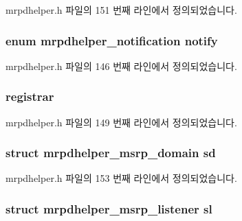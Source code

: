 mrpdhelper.\+h 파일의 151 번째 라인에서 정의되었습니다.

\subsubsection[{\texorpdfstring{notify}{notify}}]{\setlength{\rightskip}{0pt plus 5cm}enum {\bf mrpdhelper\+\_\+notification} notify}\hypertarget{structmrpdhelper__notify_a294b813b26e03fb12eb8d27538996d81}{}\label{structmrpdhelper__notify_a294b813b26e03fb12eb8d27538996d81}


mrpdhelper.\+h 파일의 146 번째 라인에서 정의되었습니다.

\subsubsection[{\texorpdfstring{registrar}{registrar}}]{ registrar}\hypertarget{structmrpdhelper__notify_acb8e6c800425979d17b2c627be3677f3}{}\label{structmrpdhelper__notify_acb8e6c800425979d17b2c627be3677f3}


mrpdhelper.\+h 파일의 149 번째 라인에서 정의되었습니다.

\subsubsection[{\texorpdfstring{sd}{sd}}]{\setlength{\rightskip}{0pt plus 5cm}struct {\bf mrpdhelper\+\_\+msrp\+\_\+domain} sd}\hypertarget{structmrpdhelper__notify_aff24770d46ca745a8f18555b3e052443}{}\label{structmrpdhelper__notify_aff24770d46ca745a8f18555b3e052443}


mrpdhelper.\+h 파일의 153 번째 라인에서 정의되었습니다.

\subsubsection[{\texorpdfstring{sl}{sl}}]{\setlength{\rightskip}{0pt plus 5cm}struct {\bf mrpdhelper\+\_\+msrp\+\_\+listener} sl}\hypertarget{structmrpdhelper__notify_aafc64a8fae35512881b906274c8248df}{}\label{structmrpdhelper__notify_aafc64a8fae35512881b906274c8248df}


